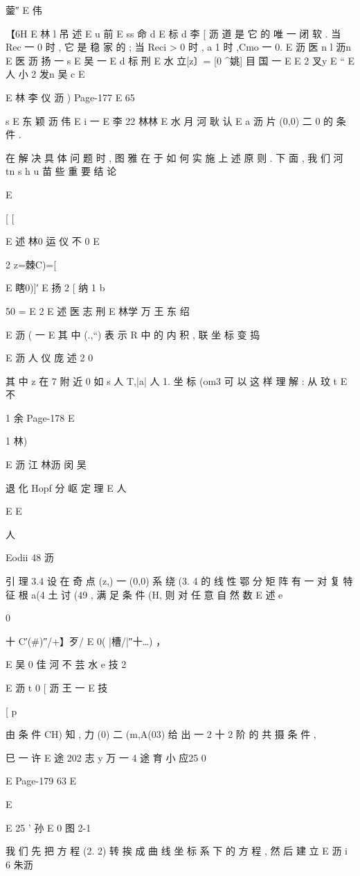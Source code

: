 {{{{{{{{{{{{{{{{{{蓥″ E 伟

【6H
E 林 l 吊 述
E u 前
E ss 命 d
E 标 d 李
[ 沥
道 是 它 的 唯 一 闭 软 . 当 Rec 一 0 时 , 它 是 稳 家 的 ; 当 Reci > 0 时 ,
a
1
时 ,Cmo 一 0.
E 沥 医 n l 沥n
E 医 沥 扬 一 s
E 吴 一
E d 标 刑
E 水
立[z〕= [0 ^姚] 目 国
一 E E 2 叉y E “
E 人 小 2 发n 吴 c
E

E 林 李 仪 沥 )
Page-177
E 65

s
E 东 颖 沥
伟
E i 一
E 李 22 林林 E 水 月 河 耿 认
E a 沥
片 (0,0) 二 0 的 条 件 .

在 解 决 具 体 问 题 时 , 图 雅 在 于 如 何 实 施 上 述 原 则 . 下 面 , 我 们
河 tn s h u
苗 些 重 要 结 论

E

[ [

E 述 林0 运 仪 不 0
E

2 z=棘C)=[

E
瞎0)]′
E 扬 2
[ 纳
1 b

50 = E 2
E 述 医 志 刑 E 林学 万 王 东 绍

E 沥 ( 一 E
其 中 (.,“) 表 示 R 中 的 内 积 , 联 坐 标 变 捣

E 沥 人 仪 庞 述 2 0

其 中 z 在 7 附 近 0 如 s 人 T,|a| 人 1. 坐 标 (om3 可 以 这 样 理 解 : 从
玟
t
E 不

1 余
Page-178
E

1 林)

E 沥 江 林沥 闵 吴

退 化 Hopf 分 岖 定 理
E 人

E
E

人

Eodii 48 沥

引 理 3.4 设 在 奇 点 (z,) 一 (0,0) 系 绕 (3. 4 的 线 性 鄂 分 矩
阵 有 一 对 复 特 征 根 a(4 土 讨 (49 , 满 足 条 件 (H, 则 对 任 意 自 然 数
E 述
e

0

十 C′(#)″/+】歹/ E 0( |槽/|″十…) ，

E 吴 0 佳 河 不 芸 水
e 技 2

E 沥 t 0
[ 沥 王 一
E 技

[ p

由 条 件 CH) 知 , 力 (0) 二 (m,A(03) 给 出 一 2 十 2 阶 的 共 摄 条 件 ,

巳 一 许
E 途 202 志 y 万 一 4 途 育 小 应25
0

E
Page-179
63 E

E

E
25
'
孙
E
0
图 2-1

我 们 先 把 方 程 (2. 2) 转 挨 成 曲 线 坐 标 系 下 的 方 程 , 然 后 建 立
E 沥 i 6 朱沥

}}}}}}}}}}}}}}}}}}
